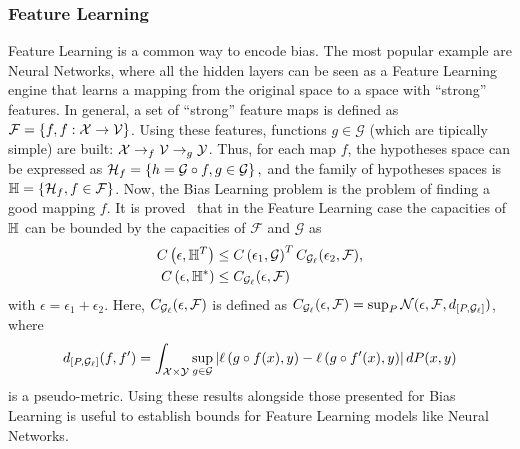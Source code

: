 \subsubsection*{Feature Learning}
Feature Learning is a common way to encode bias. The most popular example are Neural Networks, where all the hidden layers can be seen as a Feature Learning engine that learns a mapping from the original space to a space with ``strong'' features.
In general, a set of ``strong'' feature maps is defined as $\mathcal{F} = \left\{f, f: \mathcal{X} \to \mathcal{V}\right\}$. Using these features, functions $g \in \mathcal{G}$ (which are tipically simple) are built:
$\mathcal{X} \to_f \mathcal{V} \to_g \mathcal{Y}$.
Thus, for each map $f$, the hypotheses space can be expressed as 
$\mathcal{H}_f = \left\{h = \mathcal{G} \circ f, g \in \mathcal{G}\right\},$ and the family of hypotheses spaces is 
$\mathbb{H} = \left\{\mathcal{H}_f, f \in \mathcal{F}\right\}$.
Now, the Bias Learning problem is the problem of finding a good mapping $f$.
It is proved~\cite[Theorem~6]{baxter2000model} that in the Feature Learning case the capacities of $\mathbb{H}$ can be bounded by the capacities of $\mathcal{F}$ and $\mathcal{G}$ as
\begin{align*}
    C\left(\epsilon, \mathbb{H}^{T}\right) &\leq C\left(\epsilon_1, \mathcal{G}\right)^T C_{\mathcal{G}_\ell}(\epsilon_2, \mathcal{F}) , \\
    C\left(\epsilon, \mathbb{H}^{*}\right) &\leq C_{\mathcal{G}_\ell}(\epsilon, \mathcal{F})
\end{align*}
with $\epsilon = \epsilon_1 + \epsilon_2 $. Here, $C_{\mathcal{G}_\ell}(\epsilon, \mathcal{F})$ is defined as 
$C_{\mathcal{G}_\ell}(\epsilon, \mathcal{F}) = \sup_P \mathcal{N}(\epsilon, \mathcal{F}, d_{[P, \mathcal{G}_\ell]})$, where
$$ d_{[P, \mathcal{G}_\ell]}(f, f') = \int_{\mathcal{X} \times \mathcal{Y}} \sup_{g \in \mathcal{G}} \left|\ell\left( g \circ f(x), y\right) - \ell\left( g \circ f'(x), y\right)\right| dP(x, y)$$
is a pseudo-metric. Using these results alongside those presented for Bias Learning is useful to establish bounds for Feature Learning models like Neural Networks.

